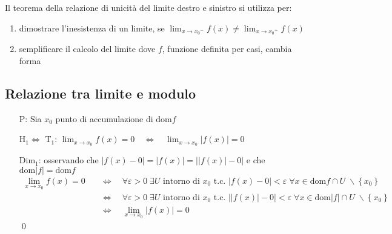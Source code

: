 \documentclass[a4paper]{article}
\newcommand\dom{\text{dom}}
\begin{document}
Il teorema della relazione di unicità del limite destro e sinistro si utilizza per:
\begin{enumerate}
	\item dimostrare l'inesistenza di un limite, se \(\displaystyle \lim_{x \to {x_0}^- } f(x) \neq \lim_{x \to {x_0}^+} f(x)\)
	\item semplificare il calcolo del limite dove \(f\), funzione definita per casi, cambia forma
\end{enumerate}

\subsection{Relazione tra limite e modulo}
\begin{itemize}
	\item[P:] Sia \(x_0\) punto di accumulazione di \(\dom f\)
	\item[H\(_1 \Leftrightarrow\) T\(_1\):] \(\displaystyle \lim_{x \to x_0} f(x) = 0 \quad \Leftrightarrow \quad \lim_{x \to x_0} \left| f(x) \right| = 0\)
	\item[Dim\(_1\):] osservando che \(\left| f(x) - 0 \right| = \left| f(x) \right| = \left| \left| f(x) \right| - 0 \right|\) e che \(\dom \left| f \right| = \dom f\)
	\begin{align*}
		\lim_{x \to x_0} f(x) = 0 \quad &\Leftrightarrow \quad \forall \varepsilon > 0 \; \exists U \text{ intorno di } x_0 \text{ t.c. } \left| f(x) - 0 \right| < \varepsilon \; \forall x \in \dom f \cap U \; \backslash \left\{ x_0 \right\} \\
		&\Leftrightarrow \quad \forall \varepsilon > 0 \; \exists U \text{ intorno di } x_0 \text{ t.c. } \left| \left| f(x) \right| - 0 \right| < \varepsilon \; \forall x \in \dom \left| f \right| \cap U \; \backslash \left\{ x_0 \right\} \\
		&\Leftrightarrow \quad \lim_{x \to x_0} \left| f(x) \right| = 0
	\end{align*} \qed
	

\end{itemize}
\end{document}
